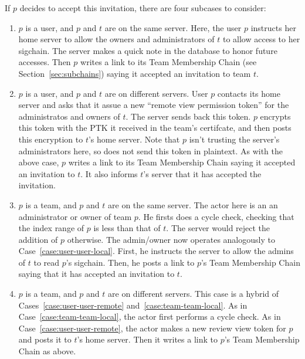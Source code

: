 If $p$ decides to accept this invitation, there are four subcases to consider:

\begin{enumerate}
\item $p$ is a user, and $p$ and $t$ are on the same server.
%
Here, the user $p$
instructs her home server to allow the owners and administrators of $t$ to allow
access to her sigchain. The server makes a quick note in the database to honor
future accesses. Then $p$ writes a link to its Team Membership Chain (see Section~\ref{sec:subchains}) 
saying it accepted an invitation to team $t$.
\label{case:user-user-local}

\item $p$ is a user, and $p$ and $t$ are on different servers.
%
User $p$ contacts its home server and asks that it assue a new 
``remote view permission token'' for the administratos and owners of $t$.
The server sends back this token. $p$ encrypts this token with the PTK
it received in the team's certifcate, and then posts this encryption to
$t$'s home server. Note that $p$ isn't trusting the server's administrators 
here, so does not send this token in plaintext. As with the above case,
$p$ writes a link to its Team Membership Chain saying it accepted an invitation
to $t$. It also informs $t$'s server that it has accepted the invitation.
\label{case:user-user-remote}

\item $p$ is a team, and $p$ and $t$ are on the same server. 
% 
The actor here is an an administrator or owner of team $p$. He firsts does a
cycle check, checking that the index range of $p$ is less than that of $t$.
The server would reject the addition of $p$ otherwise. The admin/owner now
operates analogously to Case~\ref{case:user-user-local}.  First, he
instructs the server to allow the admins of $t$ to read $p$'s sigchain.
Then, he posts a link to $p$'s Team Membership Chain saying that it has
accepted an invitation to $t$.
\label{case:team-team-local}
    
\item $p$ is a team, and $p$ and $t$ are on different servers.
%
This case is a hybrid of Cases~\ref{case:user-user-remote} and~\ref{case:team-team-local}.
As in Case~\ref{case:team-team-local}, the actor first performs a cycle check.
As in Case~\ref{case:user-user-remote}, the actor makes a new review view token
for $p$ and posts it to $t$'s home server. Then it writes a link to $p$'s
Team Membership Chain as above.
\label{case:team-team-remote}

\end{enumerate}

